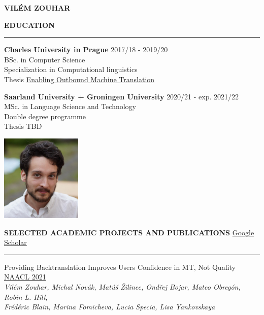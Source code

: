 \documentclass[11pt,a4paper]{article} %
\newcommand{\hSection}[1]{
    \medskip
    \MakeUppercase{\bf #1}
    \medskip
    \hrule
}
\newcommand{\hSectionI}[2]{
    \medskip
    \MakeUppercase{\bf #1}
    \hfill
    #2
    \medskip
    \hrule
}
\newcommand{\hSubsectionB}[3]{
    {#1} \hfill {\footnotesize #2}\hspace{-1cm}\\
    \vspace{-0.2cm} \hspace{-0.17cm}\textit{\footnotesize #3}
    \vspace{0.1cm}
}
\begin{document}
\begin{center}
    {\LARGE \bf VILÉM ZOUHAR} \\
    {\large \href{mailto:vilem.zouhar@gmail.com}{\color{black}{vilem.zouhar@gmail.com}}}
\end{center}

\vspace{\baselineskip}

\begin{minipage}{0.75\textwidth}
\hSection{Education}\vspace{0.2cm}
{\bf Charles University in Prague} \hfill {2017/18 - 2019/20} \\
BSc. in Computer Science \\
Specialization in Computational linguistics \\
Thesis \href{https://dspace.cuni.cz/bitstream/handle/20.500.11956/119400/130284419.pdf?sequence=1&isAllowed=y}{Enabling Outbound Machine Translation}

\vspace{\baselineskip}

{\bf Saarland University\hspace{-0.1cm} +\hspace{-0.1cm} Groningen University} \hfill {2020/21 - exp. 2021/22} \\
MSc. in Language Science and Technology \\
Double degree programme \\
Thesis TBD
\end{minipage}
\begin{minipage}{0.25\textwidth}
    \center
    \vspace{0.5cm}
    \hfill
    \includegraphics[width=3.85cm]{portrait.jpg}
\end{minipage}

\hSectionI{Selected Academic Projects and Publications}{\href{https://scholar.google.com/citations?user=2EUDwtkAAAAJ}{Google Scholar}\hspace{-1.12cm}}

\hSubsectionB
{Providing Backtranslation Improves Users Confidence in MT, Not Quality}
{\href{https://arxiv.org/pdf/2104.05688.pdf}{NAACL 2021}}
{Vilém Zouhar, Michal Novák, Matúš Žilinec, Ondřej Bojar, Mateo Obregón, Robin L. Hill,\\ Frédéric Blain, Marina Fomicheva, Lucia Specia, Lisa Yankovskaya}
\vspace{-0.11cm}
\end{document}
